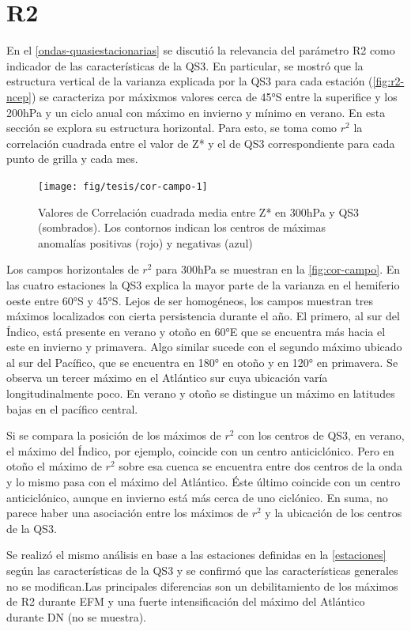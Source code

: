 \documentclass[spanish,a4paper,12pt,oneside]{book}
\begin{document}
\section{R2}\label{r2}

En el \autoref{ondas-quasiestacionarias} se discutió la relevancia del
parámetro R2 como indicador de las características de la QS3. En
particular, se mostró que la estructura vertical de la varianza
explicada por la QS3 para cada estación (\autoref{fig:r2-ncep}) se
caracteriza por máxixmos valores cerca de 45°S entre la superifice y los
200hPa y un ciclo anual con máximo en invierno y mínimo en verano. En
esta sección se explora su estructura horizontal. Para esto, se toma
como \(r^2\) la correlación cuadrada entre el valor de Z* y el de QS3
correspondiente para cada punto de grilla y cada mes.

\begin{figure}
\texttt{[image: fig/tesis/cor-campo-1]} \caption{Valores de Correlación cuadrada media entre Z* en 300hPa y QS3 (sombrados). Los contornos indican los centros de máximas anomalías positivas (rojo) y negativas (azul)}\label{fig:cor-campo}
\end{figure}

Los campos horizontales de \(r^2\) para 300hPa se muestran en la
\autoref{fig:cor-campo}. En las cuatro estaciones la QS3 explica la
mayor parte de la varianza en el hemiferio oeste entre 60°S y 45°S.
Lejos de ser homogéneos, los campos muestran tres máximos localizados
con cierta persistencia durante el año. El primero, al sur del Índico,
está presente en verano y otoño en 60°E que se encuentra más hacia el
este en invierno y primavera. Algo similar sucede con el segundo máximo
ubicado al sur del Pacífico, que se encuentra en 180° en otoño y en 120°
en primavera. Se observa un tercer máximo en el Atlántico sur cuya
ubicación varía longitudinalmente poco. En verano y otoño se distingue
un máximo en latitudes bajas en el pacífico central.

Si se compara la posición de los máximos de \(r^2\) con los centros de
QS3, en verano, el máximo del Índico, por ejemplo, coincide con un
centro anticiclónico. Pero en otoño el máximo de \(r^2\) sobre esa
cuenca se encuentra entre dos centros de la onda y lo mismo pasa con el
máximo del Atlántico. Éste último coincide con un centro anticiclónico,
aunque en invierno está más cerca de uno ciclónico. En suma, no parece
haber una asociación entre los máximos de \(r^2\) y la ubicación de los
centros de la QS3.

Se realizó el mismo análisis en base a las estaciones definidas en la
\autoref{estaciones} según las características de la QS3 y se confirmó
que las características generales no se modifican.Las principales
diferencias son un debilitamiento de los máximos de R2 durante EFM y una
fuerte intensificación del máximo del Atlántico durante DN (no se
muestra).
\end{document}
